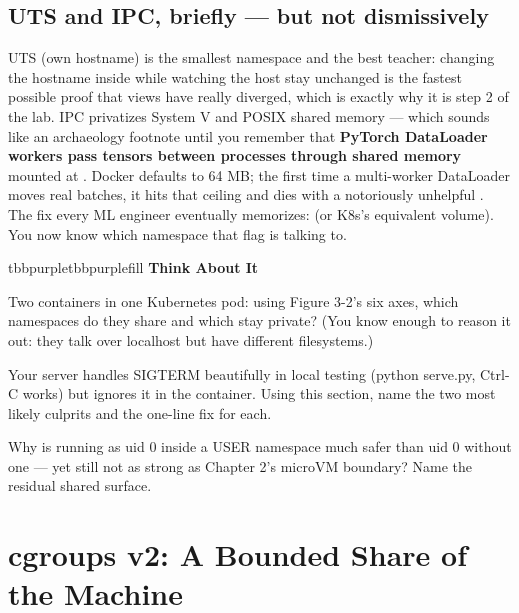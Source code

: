 \subsection*{UTS and IPC, briefly — but not dismissively}

UTS (own hostname) is the smallest namespace and the best teacher: changing the hostname inside while watching the host stay unchanged is the fastest possible proof that views have really diverged, which is exactly why it is step 2 of the lab. IPC privatizes System V and POSIX shared memory — which sounds like an archaeology footnote until you remember that \textbf{PyTorch DataLoader workers pass tensors between processes through shared memory} mounted at . Docker defaults  to 64 MB; the first time a multi-worker DataLoader moves real batches, it hits that ceiling and dies with a notoriously unhelpful . The fix every ML engineer eventually memorizes:  (or K8s's equivalent volume). You now know which namespace that flag is talking to.

\begin{calloutbox}{tbbpurple}{tbbpurplefill}
{\normalsize\bfseries\color{tbbpurple}Think About It}\par\vspace{3pt}
\begin{tbbitemize}
  \item Two containers in one Kubernetes pod: using Figure 3-2's six axes, which namespaces do they share and which stay private? (You know enough to reason it out: they talk over localhost but have different filesystems.)
  \item Your server handles SIGTERM beautifully in local testing (python serve.py, Ctrl-C works) but ignores it in the container. Using this section, name the two most likely culprits and the one-line fix for each.
  \item Why is running as uid 0 inside a USER namespace much safer than uid 0 without one — yet still not as strong as Chapter 2's microVM boundary? Name the residual shared surface.
\end{tbbitemize}
\end{calloutbox}

\section{cgroups v2: A Bounded Share of the Machine}

